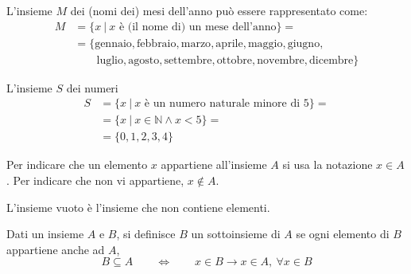 \begin{example} L'insieme $M$ dei (nomi dei) mesi dell'anno può essere rappresentato come:
\begin{equation}
\begin{aligned}
    M & = \{ x \ | \ \text{$x$ è (il nome di) un mese dell'anno} \} = \\
      & = \{ \text{gennaio}, \text{febbraio}, \text{marzo}, \text{aprile}, \text{maggio}, \text{giugno}, \\
      & \qquad \text{luglio}, \text{agosto}, \text{settembre}, \text{ottobre}, \text{novembre}, \text{dicembre}  \} 
\end{aligned}
\end{equation}
\end{example}
\begin{example} L'insieme $S$ dei numeri
\begin{equation}
\begin{aligned}
    S & = \{ x \ | \ \text{$x$ è un numero naturale minore di 5} \} = \\
      & = \{ x \ | \ x \in \mathbb{N} \land x < 5 \} = \\
      & = \{ 0, 1, 2, 3, 4 \}
\end{aligned}
\end{equation}
\end{example}

\begin{notation} Per indicare che un elemento $x$ appartiene all'insieme $A$ si usa la notazione $x \in A$. Per indicare che non vi appartiene, $x \notin A$.
\end{notation}

\begin{definition} L'insieme vuoto è l'insieme che non contiene elementi.
\end{definition}

\begin{definition}[Sottoinsieme] Dati un insieme $A$ e $B$, si definisce $B$ un sottoinsieme di $A$ se ogni elemento di $B$ appartiene anche ad $A$,
    \begin{equation}
        B \subseteq A \qquad \Leftrightarrow \qquad x \in B \rightarrow x \in A , \ \forall x \in B
    \end{equation}
\end{definition}

